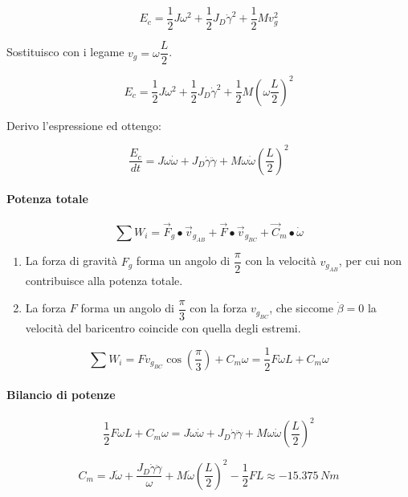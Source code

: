 \documentclass[main.tex]{subfiles}
\begin{document}
\[
E_c = \dfrac{1}{2}J\omega^2 + \dfrac{1}{2}J_D\dot{\gamma}^2 + \dfrac{1}{2}Mv_g^2
\]

Sostituisco con i legame $v_g = \omega \dfrac{L}{2} $.

\[
E_c = \dfrac{1}{2}J\omega^2 + \dfrac{1}{2}J_D\dot{\gamma}^2 + \dfrac{1}{2}M(\omega \dfrac{L}{2})^2
\]

Derivo l'espressione ed ottengo:

\[
\dfrac{E_c}{dt} = J\omega\dot{\omega} + J_D\dot{\gamma}\ddot{\gamma} + M\omega\dot{\omega}(\dfrac{L}{2})^2
\]

\paragraph{Potenza totale}

\[
\sum W_i = \vec{F}_g\bullet\vec{v}_{g_{AB}} + \vec{F}\bullet\vec{v}_{g_{BC}} + \vec{C}_m\bullet\dot{\omega}
\]

\begin{enumerate}
\item La forza di gravità $F_g$ forma un angolo di $\dfrac{\pi}{2}$ con la velocità $v_{g_{AB}}$, per cui non contribuisce alla potenza totale.
\item La forza $F$ forma un angolo di $\dfrac{\pi}{3}$ con la forza $v_{g_{BC}}$, che siccome $\dot{\beta} = 0$ la velocità del baricentro coincide con quella degli estremi.
\end{enumerate}

\[
\sum W_i = Fv_{g_{BC}}\cos\left ( \dfrac{\pi}{3} \right ) + C_m\omega = \dfrac{1}{2}F\omega L + C_m\omega
\]

\paragraph{Bilancio di potenze}

\[
	\dfrac{1}{2}F\omega L + C_m\omega = J\omega\dot{\omega} + J_D\dot{\gamma}\ddot{\gamma} + M\omega\dot{\omega}(\dfrac{L}{2})^2
\]

\[
	C_m = J\dot{\omega} + \dfrac{J_D\dot{\gamma}\ddot{\gamma}}{\omega} + M\dot{\omega}(\dfrac{L}{2})^2 - \dfrac{1}{2}F L \approx -15.375\,Nm
\]
\end{document}
